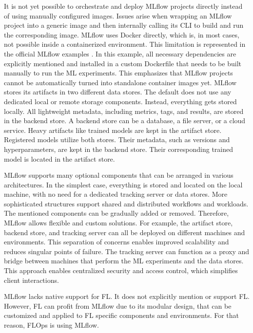 It is not yet possible to orchestrate and deploy MLflow projects directly instead of using manually configured images.
Issues arise when wrapping an MLflow project into a generic image and then internally calling its CLI to build and run the corresponding image.
MLflow uses Docker directly, which is, in most cases, not possible inside a containerized environment.
This limitation is represented in the official MLflow examples \cite{mlflow:docker_example}.
In this example, all necessary dependencies are explicitly mentioned and installed in a custom Dockerfile that needs to be built manually to run the ML experiments.
This emphasizes that MLflow projects cannot be automatically turned into standalone container images yet.
\vspace{5mm}
\newline
MLflow stores its artifacts in two different data stores.
The default does not use any dedicated local or remote storage components.
Instead, everything gets stored locally.
All lightweight metadata, including metrics, tags, and results, are stored in the backend store.
A backend store can be a database, a file server, or a cloud service.
Heavy artifacts like trained models are kept in the artifact store.
Registered models utilize both stores.
Their metadata, such as versions and hyperparameters, are kept in the backend store.
Their corresponding trained model is located in the artifact store.

MLflow supports many optional components that can be arranged in various architectures.
In the simplest case, everything is stored and located on the local machine, with no need for a dedicated tracking server or data stores.
More sophisticated structures support shared and distributed workflows and workloads.
The mentioned components can be gradually added or removed.
Therefore, MLflow allows flexible and custom solutions.
For example, the artifact store, backend store, and tracking server can all be deployed on different machines and environments.
This separation of concerns enables improved scalability and reduces singular points of failure.
The tracking server can function as a proxy and bridge between machines that perform the ML experiments and the data stores.
This approach enables centralized security and access control, which simplifies client interactions.

MLflow lacks native support for FL.
It does not explicitly mention or support FL.
However, FL can profit from MLflow due to its modular design, that can be customized and applied to FL specific components and environments.
For that reason, FLOps is using MLflow.